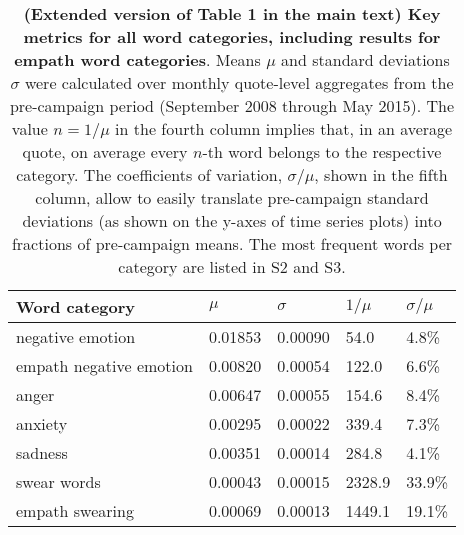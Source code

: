 \begin{table}[h]\centering
\caption{\textbf{(Extended version of Table 1 in the main text) Key metrics for all word categories, including results for empath word categories}. Means $\mu$ and standard deviations $\sigma$ were calculated over monthly quote-level aggregates from the pre-campaign period (September 2008 through May 2015). The value $n=1/\mu$ in the fourth column implies that, in an average quote, on average every $n$-th word belongs to the respective category. The coefficients of variation, $\sigma/\mu$, shown in the fifth column, allow to easily translate pre-campaign standard deviations (as shown on the y-axes of time series plots) into fractions of pre-campaign means. The most frequent words per category are listed in \SupTabs{} S2 and S3.}
	\label{fig: mean_std}
	\begin{tabular}{lllll}
	\toprule
	Word category &    $\mu$ & $\sigma$ & $1/\mu$ & $\sigma / \mu$ \\
	\midrule
	negative emotion        &  0.01853 &  0.00090 &    54.0 &          4.8\% \\
	empath negative emotion &  0.00820 &  0.00054 &   122.0 &          6.6\% \\
	anger                   &  0.00647 &  0.00055 &   154.6 &          8.4\% \\
	anxiety                 &  0.00295 &  0.00022 &   339.4 &          7.3\% \\
	sadness                 &  0.00351 &  0.00014 &   284.8 &          4.1\% \\
	swear words             &  0.00043 &  0.00015 &  2328.9 &         33.9\% \\
	empath swearing         &  0.00069 &  0.00013 &  1449.1 &         19.1\% \\
	\bottomrule
	\end{tabular}
	
\end{table}


